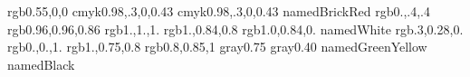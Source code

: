 %
%
%
%
\usepackage{graphics}
\usepackage{color}
\usepackage{epsfig}

\setlength{\topmargin}{-0.75in}
\setlength{\textheight}{7in}


\definecolor{headcolor}     {rgb}{0.55,0,0}
\definecolor{titlecolor}    {cmyk}{0.98,.3,0,0.43}
\definecolor{tickmarkcolor} {cmyk}{0.98,.3,0,0.43}
\definecolor{emphcolor}     {named}{BrickRed}
\definecolor{refcolor}      {rgb}{0.,.4,.4}
\definecolor{Beige}         {rgb}{0.96,0.96,0.86}
\definecolor{Background}    {rgb}{1.,1.,1.}
\definecolor{MyYellow}      {rgb}{1.,0.84,0.8}
\definecolor{Gold}          {rgb}{1.0,0.84,0.}
\definecolor{White}         {named}{White}
\definecolor{DarkGold}      {rgb}{.3,0.28,0.}
\definecolor{Blue}          {rgb}{0.,0.,1.}
\definecolor{Pink}          {rgb}{1.,0.75,0.8}
\definecolor{light-blue}    {rgb}{0.8,0.85,1}
\definecolor{mygrey}        {gray}{0.75}
\definecolor{darkgrey}      {gray}{0.40}
\definecolor{greenyellow}   {named}{GreenYellow}
\definecolor{myblack}       {named}{Black}

%

